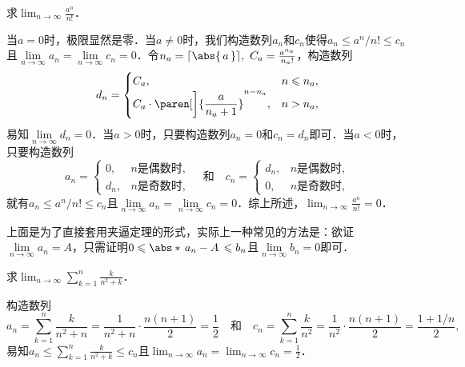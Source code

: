 \begin{example}
  \label{eg:factexp}
  求\(\displaystyle \lim_{n\to\infty} \frac{a^n}{n!}\)．\rule[-2ex]{0ex}{0ex}

  \begin{remark}
    当\(a = 0\)时，极限显然是零．当\(a \ne 0\)时，我们构造数列\(a_n\)和\(c_n\)使得\(a_n \le a^n\!/n! \le c_n\)且\(\lim\limits_{n\to\infty} a_n = \lim\limits_{n\to\infty} c_n = 0\)．令\(n_a = \ceil{\abs{\,a\,}},\ C_a = \frac{a^{n_a}}{n_a!}\)，构造数列
    \begin{equation*}
      d_n =
      \begin{cases}
        C_a, & n \le n_a, \\
        C_a \cdot \paren[\bigg]{\dfrac{a}{n_a + 1}}^{n-n_a}, & n > n_a,
      \end{cases}
    \end{equation*}
    易知\(\lim\limits_{n\to\infty} d_n = 0\)．当\(a > 0\)时，只要构造数列\(a_n = 0\)和\(c_n = d_n\)即可．当\(a < 0\)时，只要构造数列
    \begin{equation*}
      a_n =
      \begin{cases}
        0, & \text{\(n\)是偶数时}, \\
        d_n, & \text{\(n\)是奇数时},
      \end{cases}
      \quad\text{和}\quad
      c_n =
      \begin{cases}
        d_n, & \text{\(n\)是偶数时}, \\
        0, & \text{\(n\)是奇数时},
      \end{cases}
    \end{equation*}
    就有\(a_n \le a^n\!/n! \le c_n\)且\(\lim\limits_{n\to\infty} a_n = \lim\limits_{n\to\infty} c_n = 0\)．综上所述，\(\displaystyle \lim_{n\to\infty} \frac{a^n}{n!} = 0\)．\rule[-2ex]{0ex}{0ex}

    上面是为了直接套用夹逼定理的形式，实际上一种常见的方法是：欲证\(\lim\limits_{n\to\infty} a_n = A\)，只需证明\(0 \le \abs*{\,a_n - A\,} \le b_n\)且\(\lim\limits_{n\to\infty} b_n = 0\)即可．
  \end{remark}
\end{example}

\begin{example*}
  求\(\displaystyle \lim_{n\to\infty} \sum_{k=1}^n \frac{k}{n^2+k}\)．

  \begin{remark}
    构造数列
    \begin{equation*}
      a_n
      = \sum_{k=1}^n \frac{k}{n^2 + n}
      = \frac{1}{n^2 + n} \cdot \frac{n(n+1)}{2}
      = \frac12
      \quad\text{和}\quad
      c_n
      = \sum_{k=1}^n \frac{k}{n^2}
      = \frac{1}{n^2} \cdot \frac{n(n+1)}{2}
      = \frac{1 + 1/n}{2},
    \end{equation*}
    易知\(\displaystyle a_n \le \sum\limits_{k=1}^n \frac{k}{n^2+k} \le c_n\)且\(\displaystyle \lim_{n\to\infty} a_n = \lim_{n\to\infty} c_n = \frac12\)．\rule[-3ex]{0ex}{0ex}
  \end{remark}
\end{example*}

